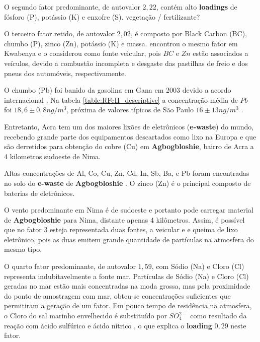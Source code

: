 O segundo fator predominante, de autovalor $2,22$, contém alto \textbf{loadings}
de fósforo (P), potássio (K) e enxofre (S). 
vegetação / fertilizante?

O terceiro fator retido, de autovalor $2,02$, é composto por Black Carbon (BC), 
chumbo (P), zinco (Zn), potássio (K) e massa.
\cite{aboh2009} encontrou o mesmo fator em Kwabenya e o considerou como fonte
veicular, pois $BC$ e $Zn$ estão associados a veículos, devido a combustão 
incompleta e desgaste das pastilhas de freio e dos pneus dos automóveis, 
respectivamente.

O chumbo (Pb) foi banido da gasolina em Gana em 2003 devido a acordo 
internacional \citep{epa2015}.  
Na tabela \ref{table:RFcH_descriptive} a concentração média de $Pb$ 
foi $18,6 \pm 0,8 n g /m^3$, próxima de valores típicos de São Paulo 
$16 \pm 13 n g /m^3$ \citep{andrade2012}.

Entretanto, Acra tem um dos maiores lixões de eletrônicos (\textbf{e-waste}) 
do mundo, recebendo grande parte dos equipamentos descartados como lixo na 
Europa e que são derretidos para obtenção do cobre (Cu) em \textbf{Agbogbloshie},
bairro de Acra a 4 kilometros sudoeste de Nima.  

Altas concentrações de Al, Co, Cu, Zn, Cd, In, Sb, Ba, e Pb foram encontradas
no solo do \textbf{e-waste} de \textbf{Agbogbloshie} \citep{asante2012}. 
O zinco (Zn) é o principal composto de baterias de eletrônicos. 

O vento predominante em Nima é de sudoeste e portanto pode carregar material 
de \textbf{Agbogbloshie} para Nima, distante apenas 4 kilômetros. 
Assim, é possível que no fator 3 esteja representada duas fontes, a veicular e 
e queima de lixo eletrônico, pois as duas emitem grande quantidade de partículas
na atmosfera do mesmo tipo. 

O quarto fator predominante, de autovalor $1,59$, com Sódio (Na) e Cloro (Cl)
representa indubitavelmente a fonte mar. 
Partículas de Sódio (Na) e Cloro (Cl) geradas no mar estão mais concentradas 
na moda grossa, mas pela proximidade do ponto de amostragem com mar, obteu-se
concentrações suficientes que permitiram a geração de um fator. 
Em pouco tempo de residência na atmosfera, o Cloro do sal marinho envelhecido 
é substituído por $SO_4^{2-}$ como resultado da reação com ácido sulfúrico e 
ácido nítrico \citep{mcinnes1994}, o que explica o \textbf{loading} $0,29$ 
neste fator.

